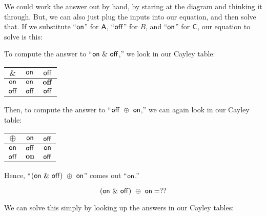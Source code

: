 \documentclass[../../../main.tex]{subfiles}
\begin{document}
We could work the answer out by hand, by staring at the diagram and thinking it through. But, we can also just plug the inputs into our equation, and then solve that. If we substitute ``$\mathsf{on}$'' for $\mathsf{A}$, ``$\mathsf{off}$'' for $B$, and ``$\mathsf{on}$'' for $\mathsf{C}$, our equation to solve is this:

\begin{aside}
  \begin{remark}
    To compute the answer to ``$\mathsf{on}~\&~\mathsf{off}$,'' we look in our Cayley table:
  
    \begin{center}
      \begin{tabular}{| c || c | c |}
        \hline
        $\&$      & $\mathsf{on}$  & \cellcolor{grey3} $\mathsf{off}$ \\ \hline \hline
        \cellcolor{grey3} $\mathsf{on}$  & \cellcolor{grey3} $\mathsf{on}$  & \cellcolor{grey3} $\mathsf{\mathbf{off}}$ \\ \hline
        $\mathsf{off}$ & $\mathsf{off}$ & $\mathsf{off}$ \\ \hline
      \end{tabular}
    \end{center}

    Then, to compute the answer to ``$\mathsf{off}~\oplus~\mathsf{on}$,'' we can again look in our Cayley table:
    
    \begin{center}
      \begin{tabular}{| c || c | c |}
        \hline
        $\oplus$    & \cellcolor{grey3} $\mathsf{on}$  & $\mathsf{off}$ \\ \hline \hline
        $\mathsf{on}$  & \cellcolor{grey3} $\mathsf{off}$ & $\mathsf{on}$  \\ \hline
        \cellcolor{grey3} $\mathsf{off}$ & \cellcolor{grey3} $\mathsf{\mathbf{on}}$  & $\mathsf{off}$ \\ \hline
      \end{tabular}
    \end{center}

    Hence, ``$(\mathsf{on}~\&~\mathsf{off})~\oplus~\mathsf{on}$'' comes out ``$\mathsf{on}$.''
  \end{remark}
\end{aside}

\begin{equation*}
  (\mathsf{on}~\&~\mathsf{off})~\oplus~\mathsf{on} = ??
\end{equation*}

We can solve this simply by looking up the answers in our Cayley tables:
\end{document}
